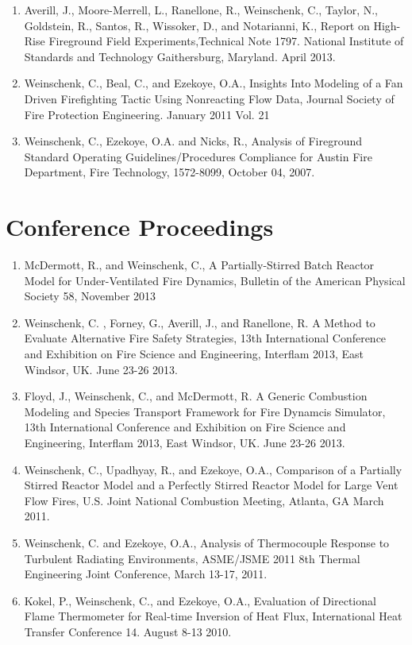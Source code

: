\documentclass[10pt,letterpaper]{article}
\begin{document}
\begin{enumerate}
\item Averill, J., Moore-Merrell, L., Ranellone, R., Weinschenk, C., Taylor, N., Goldstein, R., Santos, R., Wissoker, D., and Notarianni, K., Report on High-Rise Fireground Field Experiments,Technical Note 1797. National Institute of Standards and Technology Gaithersburg, Maryland. April 2013.
\item Weinschenk, C., Beal, C., and Ezekoye, O.A., Insights Into Modeling of a Fan Driven Firefighting Tactic Using Nonreacting Flow Data, Journal Society of Fire Protection Engineering. January 2011 Vol. 21
\item Weinschenk, C., Ezekoye, O.A. and Nicks, R., Analysis of Fireground Standard Operating Guidelines/Procedures Compliance for Austin Fire Department, Fire Technology, 1572-8099, October 04, 2007.
\end{enumerate}

\clearpage

\section*{Conference Proceedings}
\begin{enumerate}
\item McDermott, R., and Weinschenk, C., A Partially-Stirred Batch Reactor Model for Under-Ventilated Fire Dynamics, Bulletin of the American Physical Society 58, November 2013
\item Weinschenk, C. , Forney, G., Averill, J., and Ranellone, R. A Method to Evaluate Alternative Fire Safety Strategies, 13th International Conference and Exhibition on Fire Science and Engineering, Interflam 2013, East Windsor, UK. June 23-26 2013.
\item Floyd, J., Weinschenk, C., and McDermott, R. A Generic Combustion Modeling and Species Transport Framework for Fire Dynamcis Simulator, 13th International Conference and Exhibition on Fire Science and Engineering, Interflam 2013, East Windsor, UK. June 23-26 2013.
\item Weinschenk, C., Upadhyay, R., and Ezekoye, O.A., Comparison of a Partially Stirred Reactor Model and a Perfectly Stirred Reactor Model for Large Vent Flow Fires, U.S. Joint National Combustion Meeting, Atlanta, GA March 2011.
\item Weinschenk, C. and Ezekoye, O.A., Analysis of Thermocouple Response to Turbulent Radiating Environments, ASME/JSME 2011 8th Thermal Engineering Joint Conference, March 13-17, 2011.
\item  Kokel, P., Weinschenk, C., and Ezekoye, O.A., Evaluation of Directional Flame Thermometer for Real-time Inversion of Heat Flux, International Heat Transfer Conference 14. August 8-13 2010.
\end{enumerate}
\end{document}
